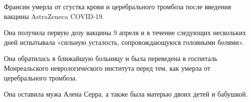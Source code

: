 Франсин умерла от сгустка крови и церебрального тромбоза после введения вакцины
AstraZeneca COVID-19.

Она получила первую дозу вакцины 9 апреля и в течение следующих нескольких дней
испытывала «сильную усталость, сопровождающуюся головными болями».

Она обратилась в ближайшую больницу и была переведена в госпиталь Монреальского
неврологического института перед тем, как умерла от церебрального тромбоза.

Она оставила мужа Алена Серра, а также была матерью двоих детей и бабушкой.

